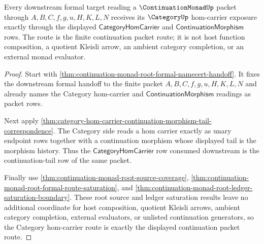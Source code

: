 \begin{theorem}
\label{thm:category-continuationmonad-hom-carrier-route}
Every downstream formal target reading a $\ContinuationMonadUp$ packet through
$A,B,C,f,g,u,H,K,L,N$ receives its $\CategoryUp$ hom-carrier exposure exactly
through the displayed $\mathsf{CategoryHomCarrier}$ and
$\mathsf{ContinuationMorphism}$ rows. The route is the finite continuation
packet route; it is not host function composition, a quotient Kleisli arrow,
an ambient category completion, or an external monad evaluator.
\end{theorem}
\begin{proof}
Start with \autoref{thm:continuation-monad-root-formal-namecert-handoff}. It
fixes the downstream formal handoff to the finite packet
$A,B,C,f,g,u,H,K,L,N$ and already names the Category hom-carrier and
$\mathsf{ContinuationMorphism}$ readings as packet rows.

Next apply
\autoref{thm:category-hom-carrier-continuation-morphism-tail-correspondence}.
The Category side reads a hom carrier exactly as unary endpoint rows together
with a continuation morphism whose displayed tail is the morphism history.
Thus the $\mathsf{CategoryHomCarrier}$ row consumed downstream is the
continuation-tail row of the same packet.

Finally use \autoref{thm:continuation-monad-root-source-coverage},
\autoref{thm:continuation-monad-root-formal-route-saturation}, and
\autoref{thm:continuation-monad-root-ledger-saturation-boundary}. These root
source and ledger saturation results leave no additional coordinate for host
composition, quotient Kleisli arrows, ambient category completion, external
evaluators, or unlisted continuation generators, so the Category hom-carrier
route is exactly the displayed continuation packet route.
\end{proof}

